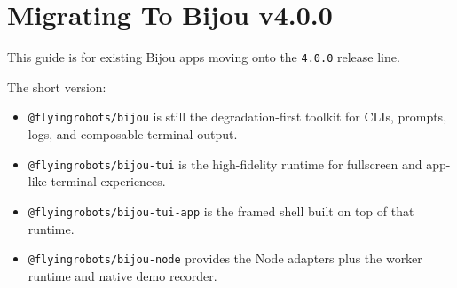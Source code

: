 \chapter{Migrating To Bijou v4.0.0}\label{record-010}

\smallskip

This guide is for existing Bijou apps moving onto the \texttt{4\allowbreak{}.\allowbreak{}0\allowbreak{}.\allowbreak{}0} release line.

The short version:

\begin{itemize}
\tightlist
\item
  \texttt{@\allowbreak{}f\allowbreak{}l\allowbreak{}y\allowbreak{}i\allowbreak{}n\allowbreak{}g\allowbreak{}r\allowbreak{}o\allowbreak{}b\allowbreak{}o\allowbreak{}t\allowbreak{}s\allowbreak{}/\allowbreak{}b\allowbreak{}i\allowbreak{}j\allowbreak{}o\allowbreak{}u} is still the degradation-first toolkit for CLIs, prompts, logs, and composable terminal output.
\item
  \texttt{@\allowbreak{}f\allowbreak{}l\allowbreak{}y\allowbreak{}i\allowbreak{}n\allowbreak{}g\allowbreak{}r\allowbreak{}o\allowbreak{}b\allowbreak{}o\allowbreak{}t\allowbreak{}s\allowbreak{}/\allowbreak{}b\allowbreak{}i\allowbreak{}j\allowbreak{}o\allowbreak{}u\allowbreak{}-\allowbreak{}t\allowbreak{}u\allowbreak{}i} is the high-fidelity runtime for fullscreen and app-like terminal experiences.
\item
  \texttt{@\allowbreak{}f\allowbreak{}l\allowbreak{}y\allowbreak{}i\allowbreak{}n\allowbreak{}g\allowbreak{}r\allowbreak{}o\allowbreak{}b\allowbreak{}o\allowbreak{}t\allowbreak{}s\allowbreak{}/\allowbreak{}b\allowbreak{}i\allowbreak{}j\allowbreak{}o\allowbreak{}u\allowbreak{}-\allowbreak{}t\allowbreak{}u\allowbreak{}i\allowbreak{}-\allowbreak{}a\allowbreak{}p\allowbreak{}p} is the framed shell built on top of that runtime.
\item
  \texttt{@\allowbreak{}f\allowbreak{}l\allowbreak{}y\allowbreak{}i\allowbreak{}n\allowbreak{}g\allowbreak{}r\allowbreak{}o\allowbreak{}b\allowbreak{}o\allowbreak{}t\allowbreak{}s\allowbreak{}/\allowbreak{}b\allowbreak{}i\allowbreak{}j\allowbreak{}o\allowbreak{}u\allowbreak{}-\allowbreak{}n\allowbreak{}o\allowbreak{}d\allowbreak{}e} provides the Node adapters plus the worker runtime and native demo recorder.
\end{itemize}

